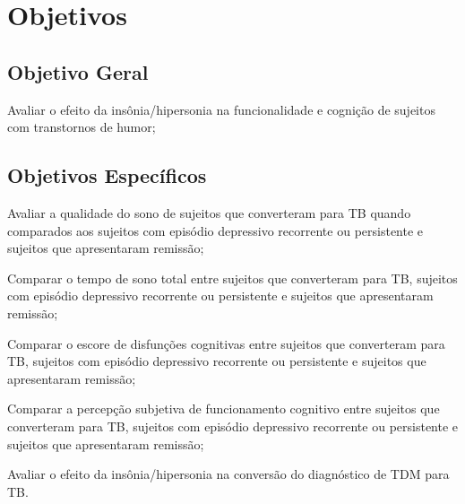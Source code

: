 \documentclass[chapter=TITLE,
               oneside,
               12pt,
               a4paper,
               english,
               brazil]{abntex2}    %
\begin{document}
\vspace{\onelineskip}
\chapter{Objetivos}\label{sec:objetivos}

    \section{Objetivo Geral}\label{sec:geral}
    
        \begin{alineas}
    
            \item Avaliar o efeito da insônia/hipersonia na funcionalidade e
            cognição de sujeitos com transtornos de humor;
    
        \end{alineas}
    
    \section{Objetivos Específicos}\label{sec:especifico}
    
        \begin{alineas}[resume]
    
            \item Avaliar a qualidade do sono de sujeitos que converteram para TB
            quando comparados aos sujeitos com episódio depressivo recorrente ou
            persistente e sujeitos que apresentaram remissão;
    
            \item Comparar o tempo de sono total entre sujeitos que converteram para
            TB, sujeitos com episódio depressivo recorrente ou persistente e sujeitos
            que apresentaram remissão;
    
            \item Comparar o escore de disfunções cognitivas entre sujeitos que
            converteram para TB, sujeitos com episódio depressivo recorrente ou
            persistente e sujeitos que apresentaram remissão;
    
            \item Comparar a percepção subjetiva de funcionamento cognitivo entre
            sujeitos que converteram para TB, sujeitos com episódio depressivo
            recorrente ou persistente e sujeitos que apresentaram remissão;
    
            \item Avaliar o efeito da insônia/hipersonia na conversão do
            diagnóstico de TDM para TB.
    
        \end{alineas}
\end{document}

